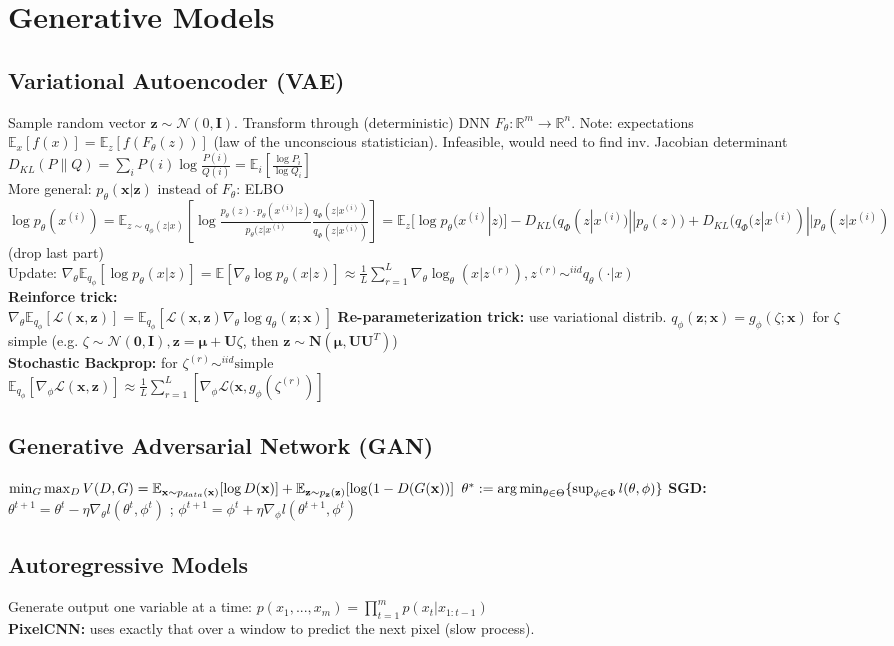 \section{Generative Models}
\subsection*{Variational Autoencoder (VAE)}
Sample random vector $\mathbf{z} \sim \mathcal{N}(0,\mathbf{I})$. Transform through (deterministic) DNN $F_\theta : \mathbb{R}^m \to \mathbb{R}^n$. Note: expectations $\mathbb{E}_x[f(x)] = \mathbb{E}_z [f(F_\theta(z))]$ (law of the unconscious statistician). Infeasible, would need to find inv. Jacobian determinant\\
$D_{KL}(P\|Q)=\sum_i P(i)\log\frac{P(i)}{Q(i)}=\mathbb{E}_i [\frac{\log P_i}{\log Q_i}]$ \\
More general: $p_\theta (\mathbf{x}|\mathbf{z}) $ instead of $F_\theta$: ELBO \\
$\log p_\theta(x^{(i)})
= \mathbb{E}_{z \sim q_\phi (z|x)} \left[\log \frac{p_\theta(z) \cdot p_\theta(x^{(i)}|z)}{p_\theta(z|x^{(i)}}\frac{q_\Phi(z|x^{(i)})}{q_\Phi(z|x^{(i)})} \right] \allowbreak
= \mathbb{E}_z[\log p_\theta (x^{(i)}|z)] - D_{KL}(q_\Phi(z|x^{(i)}) || p_\theta(z)) + D_{KL}(q_\Phi(z|x^{(i)}) || p_\theta(z|x^{(i)})$ (drop last part)\\
Update: $\nabla_\theta \mathbb{E}_{q_\phi}[\log p_\theta(x|z)] = \mathbb{E}[\nabla_\theta \log p_\theta(x|z)] \allowbreak \approx \frac 1 L \sum_{r=1}^L \nabla_\theta \log_\theta(x|z^{(r)}), z^{(r)} \sim^{iid} q_\theta (\cdot | x) $\\
\textbf{Reinforce trick:}\\ $\nabla_\theta\mathbb{E}_{q_\phi}[\mathcal{L}(\mathbf{x}, \mathbf{z})] = \mathbb{E}_{q_\phi}[\mathcal{L}(\mathbf{x}, \mathbf{z}) \nabla_\theta\log q_\theta(\mathbf{z};\mathbf{x})]$
\textbf{Re-parameterization trick:} use variational distrib. $q_\phi(\mathbf{z};\mathbf{x})=g_\phi(\zeta;\mathbf{x})$ for $\zeta$ simple (e.g. $\zeta \sim \mathcal{N}(\mathbf{0},\mathbf{I}), \mathbf{z}=\mathbf{\mu} + \mathbf{U}\zeta$, then $\mathbf{z}\sim \mathbf{N}(\mathbf{\mu}, \mathbf{UU}^T)$)\\
\textbf{Stochastic Backprop:} for $\zeta^{(r)} \sim^{iid} \text{simple}$ \\
$\mathbb{E}_{q_\phi}[\nabla_\phi\mathcal{L}(\mathbf{x}, \mathbf{z})] \approx \frac 1 L \sum_{r=1}^L [\nabla_\phi \mathcal{L}(\mathbf{x}, g_\phi(\zeta^{(r)})] $ 
\subsection*{Generative Adversarial Network (GAN)}
$\min_G \max_D V(D,G) = \mathbb{E}_{\mathbf{x}\sim p_{data}(\mathbf{x})}[\log D(\mathbf{x}) ] + \mathbb{E}_{\mathbf{z}\sim p_{\mathbf{z}}(\mathbf{\mathbf{z}})}[\log (1 - D(G(\mathbf{x})) ] \\
$ $\theta^* := \operatorname*{arg\,min}_{\theta\in \Theta} \{ \sup_{\phi \in \Phi} l(\theta, \phi)\}$
\textbf{SGD:}  $\theta^{t+1} = \theta^t - \eta \nabla_\theta l(\theta^t, \phi^t)$ ; $\phi^{t+1} = \phi^t + \eta \nabla_\phi l(\theta^{t+1}, \phi^t)$ 
\subsection*{Autoregressive Models}
Generate output one variable at a time: $p(x_1, ..., x_m) = \prod_{t=1}^m p(x_t|x_{1:t-1})$ \\\textbf{PixelCNN:} uses exactly that over a window to predict the next pixel (slow process).